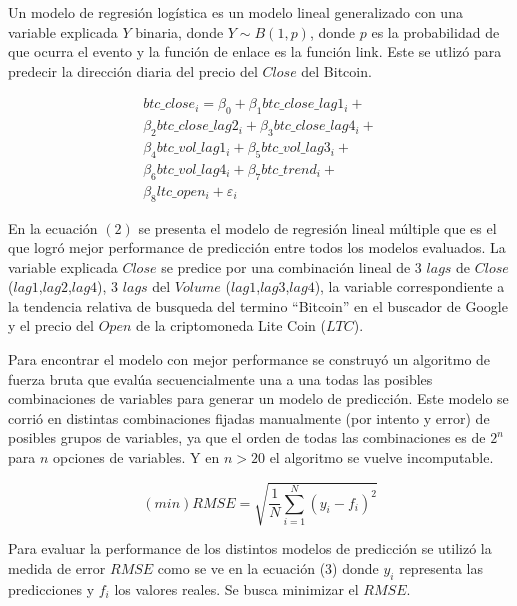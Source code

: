 \documentclass[a4paper,12pt,twocolumn]{article}
\begin{document}
Un modelo de regresión logística es un modelo lineal generalizado con una variable explicada $Y$ binaria, donde $Y \sim B(1,p)$, donde $p$ es la probabilidad de que ocurra el evento y la función de enlace es la función link. Este se utlizó para predecir la dirección diaria del precio del $Close$ del Bitcoin. 

\begin{equation}
\begin{split}
btc\_close_i  =     \beta_0 + \beta_1 btc\_close\_lag1_i    
+ \\ \beta_2 btc\_close\_lag2_i +   \beta_3 btc\_close\_lag4_i + \\ 
\beta_4 btc\_vol\_lag1_i  +  \beta_5 btc\_vol\_lag3_i + \\ \beta_6  btc\_vol\_lag4_i  +  \beta_7 btc\_trend_i + \\ \beta_8 ltc\_open_i + \varepsilon_i
\end{split}
\label{eq:modelo}
\end{equation}

En la ecuación $(2)$ se presenta el modelo de regresión lineal múltiple que es el que logró mejor performance de predicción entre todos los modelos evaluados. La variable explicada $Close$ se predice por una combinación lineal de 3 $lags$ de $Close$ ($lag1$,$lag2$,$lag4$), 3 $lags$ del $Volume$ ($lag1$,$lag3$,$lag4$), la variable correspondiente a la tendencia relativa de busqueda del termino “Bitcoin” en el buscador de Google y el precio del $Open$ de la criptomoneda Lite Coin ($LTC$).

Para encontrar el modelo con mejor performance se construyó un algoritmo de fuerza bruta que evalúa secuencialmente una a una todas las posibles combinaciones de variables para generar un modelo de predicción. Este modelo se corrió en distintas combinaciones fijadas manualmente (por intento y error) de posibles grupos de variables, ya que el orden de todas las combinaciones es de $2^n$ para $n$ opciones de variables. Y en $n>20$ el algoritmo se vuelve incomputable.

\begin{equation}
(min)RMSE=\sqrt{\frac{1}{N} \sum_{i=1}^{N}\left(y_{i}-f_{i}\right)^{2}}
\end{equation}

Para evaluar la performance de los distintos modelos de predicción se utilizó la medida de error $RMSE$ como se ve en la ecuación (3) donde $y_i$ representa las predicciones y $f_i$ los valores reales. Se busca minimizar el $RMSE$.
\end{document}
